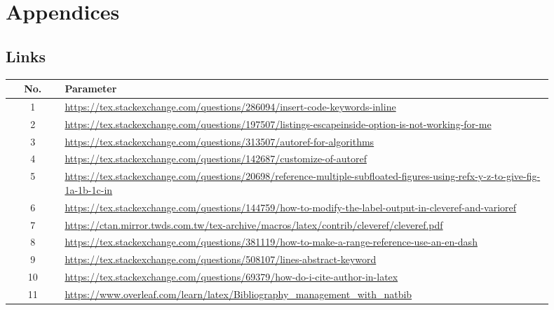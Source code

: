 \appendix
\section*{Appendices}
\renewcommand{\thesubsection}{\Alph{subsection}}

\subsection{Links}

\footnotesize
\begin{center}
    \label{table:lop}
    \begin{tabular}{ c p{0.9\linewidth} }
        \toprule
        No. & Parameter \\
        \midrule
        1 & \url{https://tex.stackexchange.com/questions/286094/insert-code-keywords-inline} \\
        2 & \url{https://tex.stackexchange.com/questions/197507/listings-escapeinside-option-is-not-working-for-me} \\
        3 & \url{https://tex.stackexchange.com/questions/313507/autoref-for-algorithms} \\
        4 & \url{https://tex.stackexchange.com/questions/142687/customize-of-autoref} \\
        5 & \url{https://tex.stackexchange.com/questions/20698/reference-multiple-subfloated-figures-using-refx-y-z-to-give-fig-1a-1b-1c-in} \\
        6 & \url{https://tex.stackexchange.com/questions/144759/how-to-modify-the-label-output-in-cleveref-and-varioref} \\
        7 & \url{https://ctan.mirror.twds.com.tw/tex-archive/macros/latex/contrib/cleveref/cleveref.pdf} \\
        8 & \url{https://tex.stackexchange.com/questions/381119/how-to-make-a-range-reference-use-an-en-dash} \\
        9 & \url{https://tex.stackexchange.com/questions/508107/lines-abstract-keyword} \\
        10 & \url{https://tex.stackexchange.com/questions/69379/how-do-i-cite-author-in-latex} \\
        11 & \url{https://www.overleaf.com/learn/latex/Bibliography_management_with_natbib} \\

\end{tabular}
\end{center}
